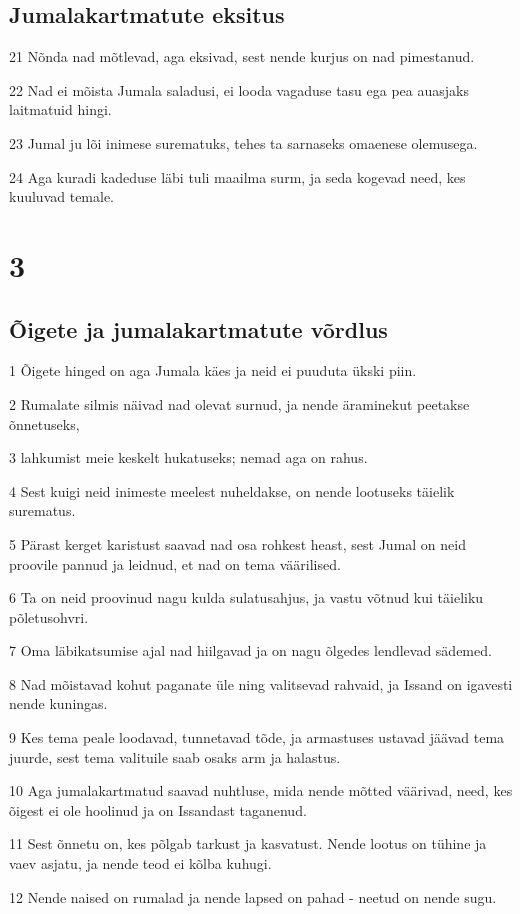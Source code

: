 \section*{Jumalakartmatute eksitus}

\par 21 Nõnda nad mõtlevad, aga eksivad, sest nende kurjus on nad pimestanud.
\par 22 Nad ei mõista Jumala saladusi, ei looda vagaduse tasu ega pea auasjaks laitmatuid hingi.
\par 23 Jumal ju lõi inimese surematuks, tehes ta sarnaseks omaenese olemusega.
\par 24 Aga kuradi kadeduse läbi tuli maailma surm, ja seda kogevad need, kes kuuluvad temale. 

\chapter{3} 

\section*{Õigete ja jumalakartmatute võrdlus}

\par 1 Õigete hinged on aga Jumala käes ja neid ei puuduta ükski piin.
\par 2 Rumalate silmis näivad nad olevat surnud, ja nende äraminekut peetakse õnnetuseks,
\par 3 lahkumist meie keskelt hukatuseks; nemad aga on rahus.
\par 4 Sest kuigi neid inimeste meelest nuheldakse, on nende lootuseks täielik surematus.
\par 5 Pärast kerget karistust saavad nad osa rohkest heast, sest Jumal on neid proovile pannud ja leidnud, et nad on tema väärilised.
\par 6 Ta on neid proovinud nagu kulda sulatusahjus, ja vastu võtnud kui täieliku põletusohvri.
\par 7 Oma läbikatsumise ajal nad hiilgavad ja on nagu õlgedes lendlevad sädemed.
\par 8 Nad mõistavad kohut paganate üle ning valitsevad rahvaid, ja Issand on igavesti nende kuningas.
\par 9 Kes tema peale loodavad, tunnetavad tõde, ja armastuses ustavad jäävad tema juurde, sest tema valituile saab osaks arm ja halastus.
\par 10 Aga jumalakartmatud saavad nuhtluse, mida nende mõtted väärivad, need, kes õigest ei ole hoolinud ja on Issandast taganenud.
\par 11 Sest õnnetu on, kes põlgab tarkust ja kasvatust. Nende lootus on tühine ja vaev asjatu, ja nende teod ei kõlba kuhugi.
\par 12 Nende naised on rumalad ja nende lapsed on pahad - neetud on nende sugu. 

